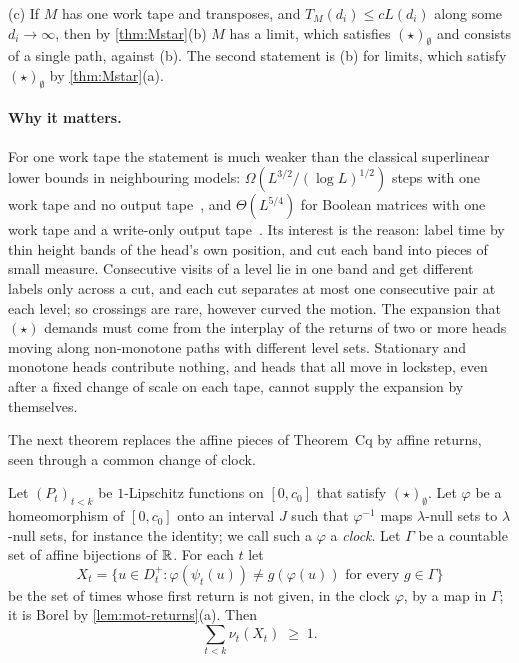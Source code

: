 \begin{informalproof}
(c) If $M$ has one work tape and transposes, and $T_M(d_i)\le cL(d_i)$ along some $d_i\to\infty$, then by
\cref{thm:Mstar}(b) $M$ has a limit, which satisfies $(\star)_\emptyset$ and consists of a single path, against (b). The
second statement is (b) for limits, which satisfy $(\star)_\emptyset$ by \cref{thm:Mstar}(a).
\end{informalproof}

\paragraph{Why it matters.} For one work tape the statement is much weaker than the classical superlinear lower bounds
in neighbouring models: $\Omega(L^{3/2}/(\log L)^{1/2})$ steps with one work tape and no output tape~\cite{DMS1991}, and
$\Theta(L^{5/4})$ for Boolean matrices with one work tape and a write-only output tape~\cite{DietzfelbingerMaass1993}.
Its interest is the reason: label time by thin height bands of the head's own position, and cut each band into pieces of
small measure. Consecutive visits of a level lie in one band and get different labels only across a cut, and each cut
separates at most one consecutive pair at each level; so crossings are rare, however curved the motion. The expansion that $(\star)$ demands must come from the interplay of
the returns of two or more heads moving along non-monotone paths with different level sets. Stationary and monotone heads
contribute nothing, and heads that all move in lockstep, even after a fixed change of scale on each tape, cannot supply
the expansion by themselves.

The next theorem replaces the affine pieces of Theorem~Cq by affine returns, seen through a common change of clock.

\begin{theorem}\label{thm:Cr}
\notformalized
Let $(P_t)_{t<k}$ be $1$-Lipschitz functions on $[0,c_0]$ that satisfy $(\star)_\emptyset$. Let $\varphi$ be a
homeomorphism of $[0,c_0]$ onto an interval $J$ such that $\varphi^{-1}$ maps $\lambda$-null sets to $\lambda$-null sets,
for instance the identity; we call such a $\varphi$ a \emph{clock}. Let $\Gamma$ be a countable set of affine bijections
of $\mathbb{R}$. For each $t$ let
\[
  X_t=\{u\in D^+_t:\varphi(\psi_t(u))\ne g(\varphi(u))\text{ for every }g\in\Gamma\}
\]
be the set of times whose first return is not given, in the clock $\varphi$, by a map in $\Gamma$; it is Borel by
\cref{lem:mot-returns}(a). Then
\[
  \sum_{t<k}\nu_t(X_t)\;\ge\;1 .
\]
\end{theorem}

